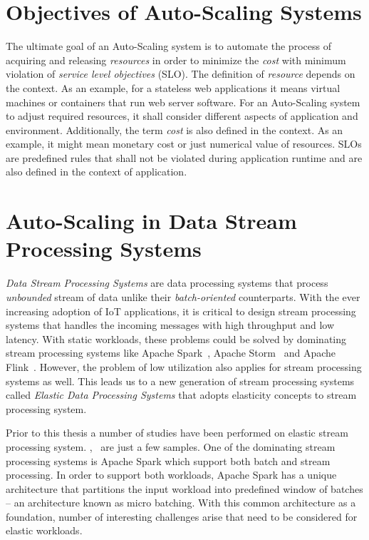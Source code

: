 \section{Objectives of Auto-Scaling Systems}
The ultimate goal of an Auto-Scaling system is to automate the process of acquiring and releasing \emph{resources} in order to minimize the \emph{cost} with minimum violation of \emph{service level objectives} (SLO). The definition of \emph{resource} depends on the context. As an example, for a stateless web applications it means virtual machines or containers that run web server software. For an Auto-Scaling system to adjust required resources, it shall consider different aspects of application and environment. Additionally, the term \emph{cost} is also defined in the context. As an example, it might mean monetary cost or just numerical value of resources. SLOs are predefined rules that shall not be violated during application runtime and are also defined in the context of application.

\section{Auto-Scaling in Data Stream Processing Systems}
\emph{Data Stream Processing Systems} are data processing systems that process \emph{unbounded} stream of data unlike their \emph{batch-oriented} counterparts. With the ever increasing adoption of IoT applications, it is critical to design stream processing systems that handles the incoming messages with high throughput and low latency. With static workloads, these problems could be solved by dominating stream processing systems like Apache Spark~\cite{spark}, Apache Storm~\cite{Storm} and Apache Flink~\cite{flink}. However, the problem of low utilization also applies for stream processing systems as well. This leads us to a new generation of stream processing systems called \emph{Elastic Data Processing Systems} that adopts elasticity concepts to stream processing system.

Prior to this thesis a number of studies have been performed on elastic stream processing system. \cite{CastroFernandez:2013},~\cite{Heinze:2014} are just a few samples. One of the dominating stream processing systems is Apache Spark which support both batch and stream processing. In order to support both workloads, Apache Spark has a unique architecture that partitions the input workload into predefined window of batches -- an architecture known as micro batching. With this common architecture as a foundation, number of interesting challenges arise that need to be considered for elastic workloads.

